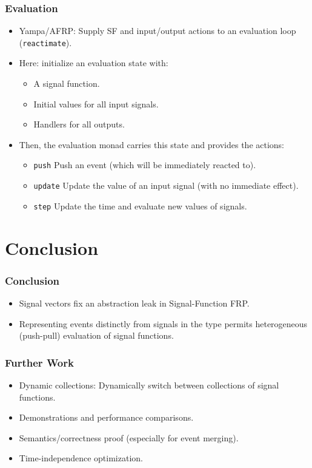 \documentclass{beamer}
\begin{document}
\begin{frame}
\frametitle{Evaluation}
    \begin{itemize}
        \item Yampa/AFRP: Supply SF and input/output actions to an evaluation loop ({\tt reactimate}).
        \item Here: initialize an evaluation state with:
        \begin{itemize}
            \item A signal function.
            \item Initial values for all input signals.
            \item Handlers for all outputs.
        \end{itemize}
        \item Then, the evaluation monad carries this state and provides the actions:
            \begin{itemize}
                \item {\tt push} Push an event (which will be immediately reacted to).
                \item {\tt update} Update the value of an input signal (with no immediate effect).
                \item {\tt step} Update the time and evaluate new values of signals.
            \end{itemize}
    \end{itemize}
\end{frame}

\section{Conclusion}

\begin{frame}
\frametitle{Conclusion}
    \begin{itemize}
        \item Signal vectors fix an abstraction leak in Signal-Function FRP.
        \item Representing events distinctly from signals in the type permits
              heterogeneous (push-pull) evaluation of signal functions.
    \end{itemize}
\end{frame}

\begin{frame}
\frametitle{Further Work}
    \begin{itemize}
        \item Dynamic collections: Dynamically switch between collections of signal functions.
        \item Demonstrations and performance comparisons.
        \item Semantics/correctness proof (especially for event merging).
        \item Time-independence optimization.
    \end{itemize}
\end{frame}
\end{document}
